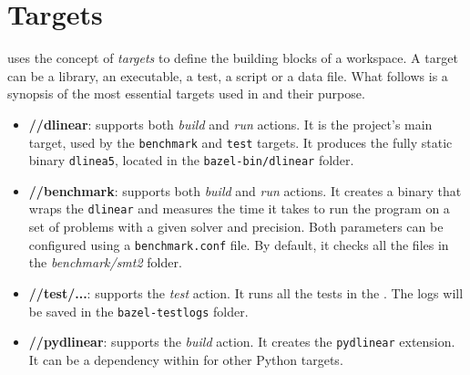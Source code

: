 

\section{Targets}

\bazel uses the concept of \textit{targets} to define the building blocks of a workspace.
A target can be a library, an executable, a test, a script or a data file.
What follows is a synopsis of the most essential targets used in \dlinear and their purpose.

\begin{itemize}
        \item \textbf{//dlinear}: supports both \textit{build} and \textit{run} actions.
              It is the project's main target, used by the \texttt{benchmark} and \texttt{test} targets.
              It produces the fully static binary \texttt{dlinea5}, located in the \texttt{bazel-bin/dlinear} folder.
        \item \textbf{//benchmark}: supports both \textit{build} and \textit{run} actions.
              It creates a binary that wraps the \texttt{dlinear} and measures the time it takes to run the program on a set of problems with a given solver and precision.
              Both parameters can be configured using a \texttt{benchmark.conf} file.
              By default, it checks all the files in the \textit{benchmark/smt2} folder.
        \item \textbf{//test/...}: supports the \textit{test} action.
              It runs all the tests in the \dlinear.
              The logs will be saved in the \texttt{bazel-testlogs} folder.
        \item \textbf{//pydlinear}: supports the \textit{build} action.
              It creates the \texttt{pydlinear} extension.
              It can be a dependency within \bazel for other Python targets.
\end{itemize}
